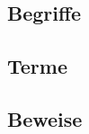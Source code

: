 \subsection{Begriffe}\label{subsec:logik_begriffe}


\subsection{Terme}\label{subsec:logik_terme}


\subsection{Beweise}\label{subsec:logik_beweise}

